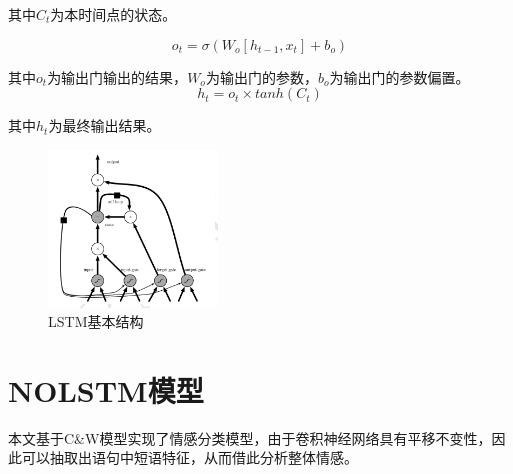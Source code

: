 其中$C_t$为本时间点的状态。


\begin{equation}
o_t = \sigma{(W_o [h_{t-1},x_t] + b_o)}
\end{equation}


其中$o_t$为输出门输出的结果，$W_o$为输出门的参数，$b_o$为输出门的参数偏置。
\begin{equation}
h_t = o_t \times tanh{(C_t)}
\end{equation}


其中$h_t$为最终输出结果。


\begin{figure}[!hbp]
\begin{center}
\includegraphics[width=0.4\textwidth]{graphic/lstm1.png}
\caption{LSTM基本结构\cite{deeplearning2016} \label{lstm1}}
\end{center}
\end{figure}

\section{NOLSTM模型}
本文基于C\&W模型实现了情感分类模型，由于卷积神经网络具有平移不变性，因此可以抽取出语句中短语特征，从而借此分析整体情感。
